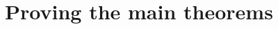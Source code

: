 \documentclass[12pt]{amsart}
\theoremstyle{definition}
\theoremstyle{remark}
\numberwithin{equation}{section}
\newcommand{\inc}{\ensuremath{\mathrm{Inc}}}
\newcommand{\incgl}{\inc_{\mathrm{gl}}}
\newcommand{\deflate}{\ensuremath{\mathsf{Defl}}}
\newcommand{\inflate}{\ensuremath{\mathsf{VecInfl}}}
\newcommand{\tinflate}{\ensuremath{\mathsf{Infl}}}
\newcommand{\content}{\ensuremath{\mathsf{Con}}}
\newcommand{\compress}{\ensuremath{\mathsf{DeflCon}}}
\begin{document}
\section{Proving the main theorems}\label{sec:arithmetic}
%

\end{document}
